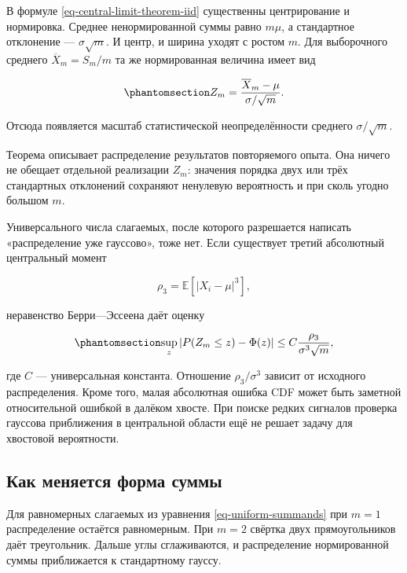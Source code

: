\documentclass[
  russian,
  11pt,
  a4paper,
  open=any]{scrbook}
\begin{document}
В формуле \ref{eq-central-limit-theorem-iid} существенны центрирование и
нормировка. Среднее ненормированной суммы равно \(m\mu\), а стандартное
отклонение --- \(\sigma\sqrt m\). И центр, и ширина уходят с ростом
\(m\). Для выборочного среднего \(\overline X_m=S_m/m\) та же
нормированная величина имеет вид

\begin{equation}\protect\phantomsection\label{eq-clt-sample-mean}{
Z_m=
\frac{\overline X_m-\mu}{\sigma/\sqrt m}.
}\end{equation}

Отсюда появляется масштаб статистической неопределённости среднего
\(\sigma/\sqrt m\).

Теорема описывает распределение результатов повторяемого опыта. Она
ничего не обещает отдельной реализации \(Z_m\): значения порядка двух
или трёх стандартных отклонений сохраняют ненулевую вероятность и при
сколь угодно большом \(m\).

Универсального числа слагаемых, после которого разрешается написать
«распределение уже гауссово», тоже нет. Если существует третий
абсолютный центральный момент

\[
\rho_3=\mathbb E\!\left[|X_i-\mu|^3\right],
\]

неравенство Берри---Эссеена даёт оценку

\begin{equation}\protect\phantomsection\label{eq-berry-esseen-bound}{
\sup_z
\left|P(Z_m\le z)-\Phi(z)\right|
\le
C\frac{\rho_3}{\sigma^3\sqrt m},
}\end{equation}

где \(C\) --- универсальная константа. Отношение \(\rho_3/\sigma^3\)
зависит от исходного распределения. Кроме того, малая абсолютная ошибка
CDF может быть заметной относительной ошибкой в далёком хвосте. При
поиске редких сигналов проверка гауссова приближения в центральной
области ещё не решает задачу для хвостовой вероятности.

\subsection{Как меняется форма суммы}\label{interactive-clt-sums}

Для равномерных слагаемых из уравнения \ref{eq-uniform-summands} при
\(m=1\) распределение остаётся равномерным. При \(m=2\) свёртка двух
прямоугольников даёт треугольник. Дальше углы сглаживаются, и
распределение нормированной суммы приближается к стандартному гауссу.
\end{document}
